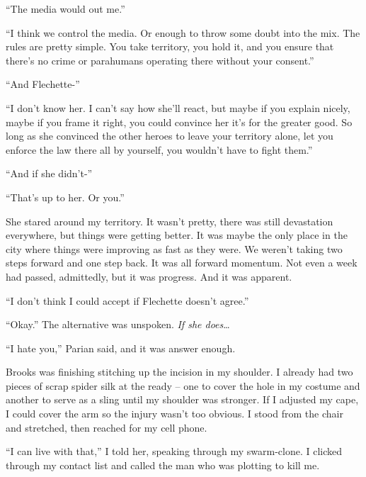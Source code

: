 ``The media would out me.''



``I think we control the media.  Or enough to throw some doubt into the mix.  The rules are pretty simple.  You take territory, you hold it, and you ensure that there's no crime or parahumans operating there without your consent.''



``And Flechette-''



``I don't know her.  I can't say how she'll react, but maybe if you explain nicely, maybe if you frame it right, you could convince her it's for the greater good.  So long as she convinced the other heroes to leave your territory alone, let you enforce the law there all by yourself, you wouldn't have to fight them.''



``And if she didn't-''



``That's up to her.  Or you.''



She stared around my territory.  It wasn't pretty, there was still devastation everywhere, but things were getting better.  It was maybe the only place in the city where things were improving as fast as they were.  We weren't taking two steps forward and one step back.  It was all forward momentum.  Not even a week had passed, admittedly, but it was progress.  And it was apparent.



``I don't think I could accept if Flechette doesn't agree.''



``Okay.''  The alternative was unspoken.  \emph{If she does}\ldots



``I hate you,'' Parian said, and it was answer enough.



Brooks was finishing stitching up the incision in my shoulder.  I already had two pieces of scrap spider silk at the ready – one to cover the hole in my costume and another to serve as a sling until my shoulder was stronger.  If I adjusted my cape, I could cover the arm so the injury wasn't too obvious.  I stood from the chair and stretched, then reached for my cell phone.



``I can live with that,'' I told her, speaking through my swarm-clone.  I clicked through my contact list and called the man who was plotting to kill me.





